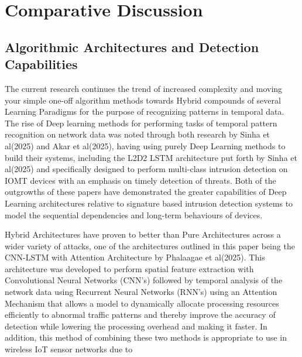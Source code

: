 \documentclass[12pt]{article}
\begin{document}
	\section{Comparative Discussion}
	

\subsection{Algorithmic Architectures and Detection Capabilities}
The current research continues the trend of increased complexity and moving your simple one-off algorithm methods towards Hybrid compounds of several Learning Paradigms for the purpose of recognizing patterns in temporal data. The rise of Deep learning methods for performing tasks of temporal pattern recognition on network data was noted through both research by Sinha et al(2025) and Akar et al(2025), having using purely Deep Learning methods to build their systems, including the L2D2 LSTM architecture put forth by Sinha et al(2025) and specifically designed to perform multi-class intrusion detection on IOMT devices with an emphasis on timely detection of threats. Both of the outgrowths of these papers have demonstrated the greater capabilities of Deep Learning architectures relative to signature based intrusion detection systems to model the sequential dependencies and long-term behaviours of devices.

Hybrid Architectures have proven to better than Pure Architectures across a wider variety of attacks, one of the architectures outlined in this paper being the CNN-LSTM with Attention Architecture by Phalaagae et al(2025). This architecture was developed to perform spatial feature extraction with Convolutional Neural Networks (CNN's) followed by temporal analysis of the network data using Recurrent Neural Networks (RNN's) using an Attention Mechanism that allows a model to dynamically allocate processing resources efficiently to abnormal traffic patterns and thereby improve the accuracy of detection while lowering the processing overhead and making it faster. In addition, this method of combining these two methods is appropriate to use in wireless IoT sensor networks due to

\end{document}
